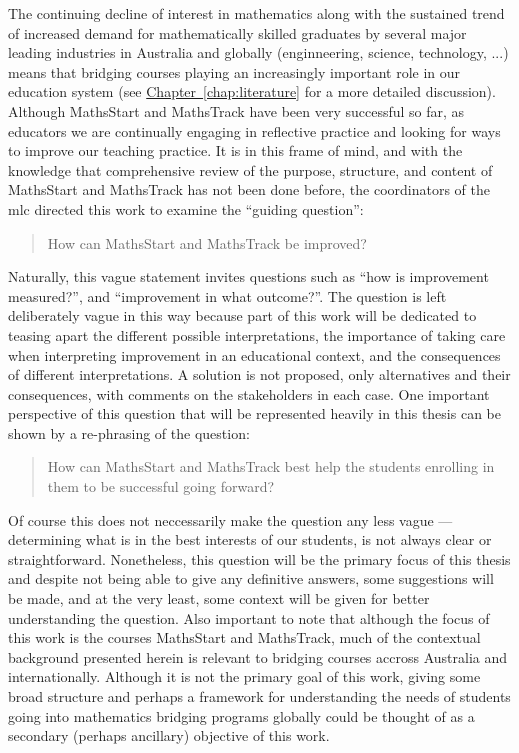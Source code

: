 \documentclass[twoside,12pt,a4paper]{report}
\newcommand{\refchap}[1]{\hyperref[chap:#1]{Chapter~\ref{chap:#1}}}
\begin{document}
The continuing decline of interest in mathematics along with the sustained trend of increased demand for mathematically skilled graduates by several major leading industries in Australia and globally (enginneering, science, technology, ...) means that bridging courses playing an increasingly important role in our education system (see \refchap{literature} for a more detailed discussion). Although MathsStart and MathsTrack have been very successful so far, as educators we are continually engaging in reflective practice and looking for ways to improve our teaching practice. It is in this frame of mind, and with the knowledge that comprehensive review of the purpose, structure, and content of MathsStart and MathsTrack has not been done before, the coordinators of the \gls{mlc} directed this work to examine the ``guiding question'':

\begin{quote}
	How can MathsStart and MathsTrack be improved?
\end{quote}

Naturally, this vague statement invites questions such as ``how is improvement measured?'', and ``improvement in what outcome?''. The question is left deliberately vague in this way because part of this work will be dedicated to teasing apart the different possible interpretations, the importance of taking care when interpreting improvement in an educational context, and the consequences of different interpretations. A solution is not proposed, only alternatives and their consequences, with comments on the stakeholders in each case. One important perspective of this question that will be represented heavily in this thesis can be shown by a re-phrasing of the question: 

\begin{quote}
	How can MathsStart and MathsTrack best help the students enrolling in them to be successful going forward?
\end{quote}

Of course this does not neccessarily make the question any less vague --- determining what is in the best interests of our students, is not always clear or straightforward. Nonetheless, this question will be the primary focus of this thesis and despite not being able to give any definitive answers, some suggestions will be made, and at the very least, some context will be given for better understanding the question. Also important to note that although the focus of this work is the courses MathsStart and MathsTrack, much of the contextual background presented herein is relevant to bridging courses accross Australia and internationally. Although it is not the primary goal of this work, giving some broad structure and perhaps a framework for understanding the needs of students going into mathematics bridging programs globally could be thought of as a secondary (perhaps ancillary) objective of this work.
\end{document}
